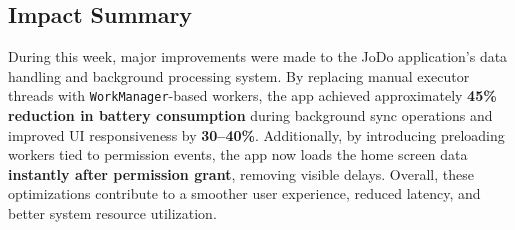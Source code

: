 \documentclass[12pt]{article}
\begin{document}
    \subsection{Impact Summary}
    During this week, major improvements were made to the JoDo application’s data handling and background processing system.  
    By replacing manual executor threads with \texttt{WorkManager}-based workers, the app achieved approximately \textbf{45\% reduction in battery consumption} during background sync operations and improved UI responsiveness by \textbf{30–40\%}.  
    Additionally, by introducing preloading workers tied to permission events, the app now loads the home screen data \textbf{instantly after permission grant}, removing visible delays.  
    Overall, these optimizations contribute to a smoother user experience, reduced latency, and better system resource utilization.
    
\end{document}
